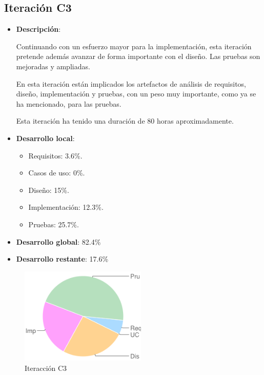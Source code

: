 \subsection*{Iteración C3}

\begin{itemize}    
\item {\bf Descripción}:

Continuando con un esfuerzo mayor para la implementación, esta iteración pretende además avanzar de forma importante con el diseño. Las pruebas son mejoradas y ampliadas.

En esta iteración están implicados los artefactos de análisis de requisitos, diseño, implementación y pruebas, con un peso muy importante, como ya se ha mencionado, para las pruebas.

Esta iteración ha tenido una duración de 80 horas aproximadamente.
\end{itemize}

\begin{minipage}[c]{0.45\linewidth}
  \begin{itemize}    
  \item {\bf Desarrollo local}:
    \begin{itemize}
    \item Requisitos: 3.6\%.
    \item Casos de uso: 0\%.
    \item Diseño: 15\%.
    \item Implementación: 12.3\%.
    \item Pruebas: 25.7\%.
    \end{itemize}
  \item {\bf Desarrollo global}: 82.4\%
  \item {\bf Desarrollo restante}: 17.6\%
  \end{itemize}
\end{minipage}
\begin{minipage}[c]{0.45\linewidth}
  \begin{figure}[H]
    \begin{center}
      \includegraphics[width=6cm]{images/c3.png}

      \caption{Iteracción C3}
      \label{fig::c3}
    \end{center}
  \end{figure}
\end{minipage}

